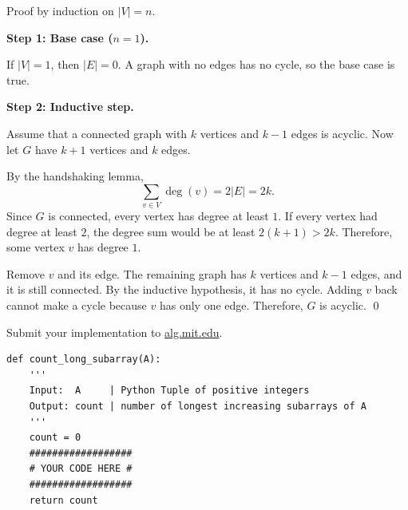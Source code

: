 \documentclass[12pt,twoside]{article}
\begin{document}
\begin{problems}
Proof by induction on $|V|=n$.

\textbf{Step 1: Base case ($n=1$).}

If $|V|=1$, then $|E|=0$. A graph with no edges has no cycle, so the base
case is true.

\textbf{Step 2: Inductive step.}

Assume that a connected graph with $k$ vertices and $k-1$ edges is
acyclic. Now let $G$ have $k+1$ vertices and $k$ edges.

By the handshaking lemma,
\[
    \sum_{v\in V}\deg(v)=2|E|=2k.
\]
Since $G$ is connected, every vertex has degree at least $1$. If every
vertex had degree at least $2$, the degree sum would be at least
$2(k+1)>2k$. Therefore, some vertex $v$ has degree $1$.

Remove $v$ and its edge. The remaining graph has $k$ vertices and $k-1$
edges, and it is still connected. By the inductive hypothesis, it has no
cycle. Adding $v$ back cannot make a cycle because $v$ has only one edge.
Therefore, $G$ is acyclic. \qed

\problem  %
Submit your implementation to {\small\url{alg.mit.edu}}.

\begin{lstlisting}
def count_long_subarray(A):
    '''
    Input:  A     | Python Tuple of positive integers
    Output: count | number of longest increasing subarrays of A
    '''
    count = 0
    ##################
    # YOUR CODE HERE #
    ##################
    return count
\end{lstlisting}

\end{problems}
\end{document}
